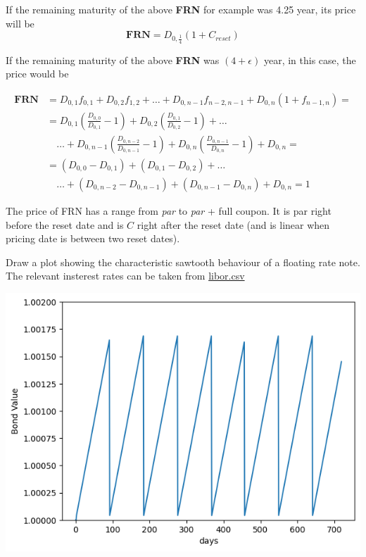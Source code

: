 \documentclass[12pt,a4paper]{article}
\begin{document}
If the remaining maturity of the above \textbf{FRN} for example was 4.25 year, its price will be
\begin{equation}
	\textbf{FRN} = D_{0,\frac{1}{4}}(1+C_{reset})
\end{equation}

If the remaining maturity of the above \textbf{FRN} was $(4 + \epsilon)$ year, in this case, the price would be

\begin{equation}
	\begin{aligned}
		\textbf{FRN} &= D_{0,1}f_{0,1}+ D_{0,2}f_{1,2} + \ldots + D_{0,n-1}f_{n-2,n-1} + D_{0,n}(1+f_{n-1,n}) = \\
		& = D_{0,1}\left(\frac{D_{0,0}}{D_{0,1}}-1\right) + D_{0,2}\left(\frac{D_{0,1}}{D_{0,2}}-1\right) + \ldots \\
		&\quad\ldots + D_{0,n-1}\left(\frac{D_{0,n-2}}{D_{0,n-1}}-1\right) + D_{0,n}\left(\frac{D_{0,n-1}}{D_{0,n}}-1\right) + D_{0,n} = \\
		&= (D_{0,0}-D_{0,1})+(D_{0,1}-D_{0,2}) + \ldots \\
		&\quad\ldots + (D_{0,n-2}-D_{0,n-1})+(D_{0,n-1}-D_{0,n})+D_{0,n} = 1
	\end{aligned}
\end{equation}

The price of FRN has a range from \emph{par} to \emph{par} + full coupon. It is par right before the reset date and is $C$ right after the reset date (and is linear when pricing date is between two reset dates).

\begin{question}
	Draw a plot showing the characteristic sawtooth behaviour of a floating rate note. The relevant insterest rates can be taken from \href{https://raw.githubusercontent.com/matteosan1/advanced\_financial\_modeling/master/input_files/libor.csv}{libor.csv}
	
	\begin{center}
		\includegraphics[width=0.6\linewidth]{addons/floating_rate_note}
	\end{center}
\end{question}
\end{document}
